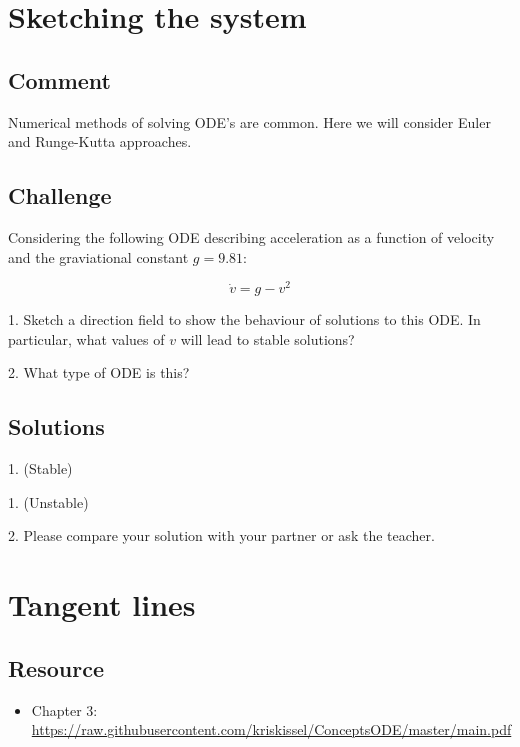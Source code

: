 \section{Sketching the system}
\label{sec:numericalfield}

\subsection*{Comment}
Numerical methods of solving ODE's are common. Here we will consider Euler and Runge-Kutta approaches.

\subsection*{Challenge}

Considering the following ODE describing acceleration as a function of velocity and the graviational constant $g=9.81$:

\begin{equation}
    \dot{v} = g - v^2
\end{equation}

1. Sketch a direction field to show the behaviour of solutions to this ODE. In particular, what values of $v$ will lead to stable solutions?

2. What type of ODE is this?

\subsection*{Solutions}
1. (Stable)\\

1. (Unstable)\\

2. Please compare your solution with your partner or ask the teacher.




\newpage
\section{Tangent lines}

\subsection*{Resource}
\begin{itemize}
    \item Chapter 3: \url{https://raw.githubusercontent.com/kriskissel/ConceptsODE/master/main.pdf}
\end{itemize}

